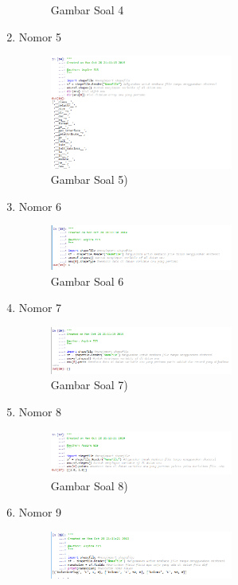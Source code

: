 \begin{enumerate}
\begin{figure}[H]
		\centering
		\caption{Gambar Soal 4}
	\end{figure}
	\item Nomor 5
	
	\begin{figure}[H]
		\includegraphics[width=6cm]{figures/Tugas3/1174074/soal5.png}
		\centering
		\caption{Gambar Soal 5)}
	\end{figure}
	\item Nomor 6
	
	\begin{figure}[H]
		\includegraphics[width=6cm]{figures/Tugas3/1174074/soal6.png}
		\centering
		\caption{Gambar Soal 6}
	\end{figure}
	\item Nomor 7
	
	\begin{figure}[H]
		\includegraphics[width=6cm]{figures/Tugas3/1174074/soal7.png}
		\centering
		\caption{Gambar Soal 7)}
	\end{figure}
	\item Nomor 8
	
	\begin{figure}[H]
		\includegraphics[width=6cm]{figures/Tugas3/1174074/soal8.png}
		\centering
		\caption{Gambar Soal 8)}
	\end{figure}
	\item Nomor 9
	
	\begin{figure}[H]
		\includegraphics[width=6cm]{figures/Tugas3/1174074/soal9.png}

\end{figure}
\end{enumerate}

